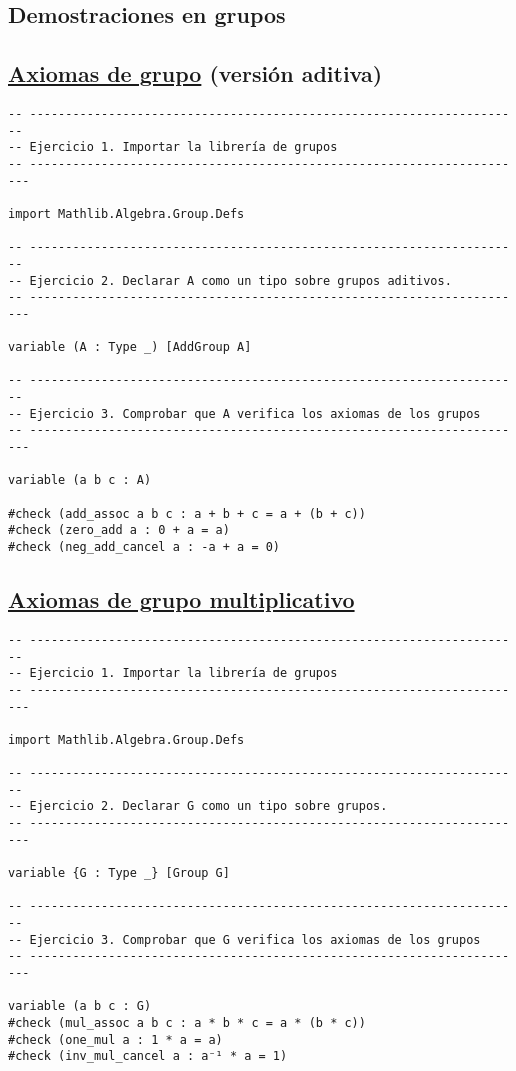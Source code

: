 \subsection{Demostraciones en grupos}
\label{sec:org455397d}

\subsection{\href{./src/Basicos/Axiomas\_de\_grupo.lean}{Axiomas de grupo} (versión aditiva)}
\label{sec:orgd4fc0f3}
\begin{verbatim}
-- ---------------------------------------------------------------------
-- Ejercicio 1. Importar la librería de grupos
-- ----------------------------------------------------------------------

import Mathlib.Algebra.Group.Defs

-- ---------------------------------------------------------------------
-- Ejercicio 2. Declarar A como un tipo sobre grupos aditivos.
-- ----------------------------------------------------------------------

variable (A : Type _) [AddGroup A]

-- ---------------------------------------------------------------------
-- Ejercicio 3. Comprobar que A verifica los axiomas de los grupos
-- ----------------------------------------------------------------------

variable (a b c : A)

#check (add_assoc a b c : a + b + c = a + (b + c))
#check (zero_add a : 0 + a = a)
#check (neg_add_cancel a : -a + a = 0)
\end{verbatim}

\subsection{\href{./src/Basicos/Axiomas\_de\_grupo\_multiplicativo.lean}{Axiomas de grupo multiplicativo}}
\label{sec:org69bbb23}
\begin{verbatim}
-- ---------------------------------------------------------------------
-- Ejercicio 1. Importar la librería de grupos
-- ----------------------------------------------------------------------

import Mathlib.Algebra.Group.Defs

-- ---------------------------------------------------------------------
-- Ejercicio 2. Declarar G como un tipo sobre grupos.
-- ----------------------------------------------------------------------

variable {G : Type _} [Group G]

-- ---------------------------------------------------------------------
-- Ejercicio 3. Comprobar que G verifica los axiomas de los grupos
-- ----------------------------------------------------------------------

variable (a b c : G)
#check (mul_assoc a b c : a * b * c = a * (b * c))
#check (one_mul a : 1 * a = a)
#check (inv_mul_cancel a : a⁻¹ * a = 1)
\end{verbatim}

